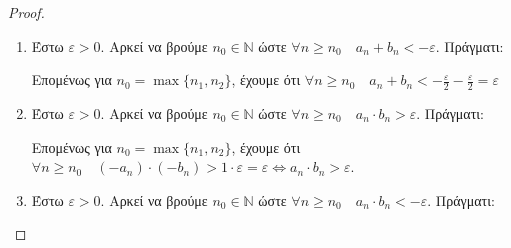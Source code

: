 \documentclass[a4paper,table]{report}
\begin{document}
\begin{proof}
  \begin{enumerate}
    \item Έστω $ \varepsilon >0 $. Αρκεί να βρούμε $ n_{0} \in \mathbb{N} $ ώστε 
      $ \forall n \geq n_{0} \quad a_{n}+b_{n} < - \varepsilon $. Πράγματι:
      Επομένως για $ n_{0}= \max \{ n_{1}, n_{2} \} $, έχουμε ότι $ \forall n \geq n_{0}
      \quad a_{n}+ b_{n} < - \frac{\varepsilon}{2} - \frac{\varepsilon}{2} = 
      \varepsilon $
    \item Έστω $ \varepsilon >0 $. Αρκεί να βρούμε $ n_{0} \in \mathbb{N} $ ώστε 
      $ \forall n \geq n_{0} \quad a_{n}\cdot b_{n} > \varepsilon $. Πράγματι:
      Επομένως για $ n_{0}= \max \{ n_{1}, n_{2} \} $, έχουμε ότι $ \forall n \geq n_{0}
      \quad (- a_{n}) \cdot (-b_{n}) >  1 \cdot \varepsilon = \varepsilon 
      \Leftrightarrow a_{n}\cdot b_{n} > \varepsilon $. 
    \item Έστω $ \varepsilon >0 $. Αρκεί να βρούμε $ n_{0} \in \mathbb{N} $ ώστε 
      $ \forall n \geq n_{0} \quad a_{n}\cdot b_{n} < - \varepsilon $. Πράγματι:
\end{enumerate}
\end{proof}
\end{document}
